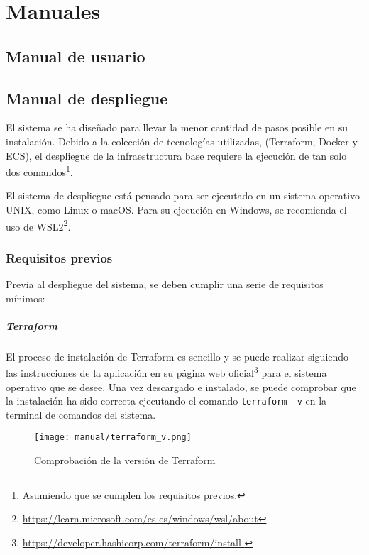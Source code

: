\chapter{Manuales}\label{chap:manual}

\section{Manual de usuario}\label{sec:manual_usuario}


\newpage{}
\section{Manual de despliegue}\label{sec:manual_despliegue}
El sistema se ha diseñado para llevar la menor cantidad de pasos posible en su
instalación. Debido a la colección de tecnologías utilizadas, (Terraform,
Docker y ECS), el despliegue de la infraestructura base requiere la ejecución de
tan solo dos comandos\footnote{Asumiendo que se cumplen los requisitos previos.}.

El sistema de despliegue está pensado para ser ejecutado en un sistema operativo
UNIX, como Linux o macOS. Para su ejecución en Windows, se recomienda el uso
de WSL2\footnote{\url{https://learn.microsoft.com/es-es/windows/wsl/about}}.


\subsection{Requisitos previos}
Previa al despliegue del sistema, se deben cumplir una serie de requisitos
mínimos:


\paragraph{Terraform}
El proceso de instalación de Terraform es sencillo y se puede realizar siguiendo
las instrucciones de la aplicación en su página web oficial\footnote{\url{
	https://developer.hashicorp.com/terraform/install
}} para el sistema operativo que se desee. Una vez descargado e instalado,
se puede comprobar que la instalación ha sido correcta ejecutando el comando
\texttt{terraform -v} en la terminal de comandos del sistema.

\begin{figure}[H]
	\centering
	\texttt{[image: manual/terraform\_v.png]}
	\caption{Comprobación de la versión de Terraform}
	\label{fig:terraform_version}
\end{figure}


